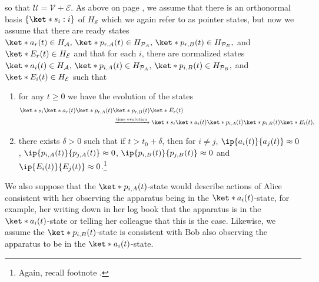 \documentclass[12pt]{report}
\begin{document}
    so that $\mathcal{U}=\mathcal{V}+\mathcal{E}$. As above on page \pageref{pointer}, we  assume that there is an orthonormal basis $\{\ket*{s_i}:i\}$ of $H_\mathcal{S}$ which we again refer to as pointer states, but now we assume that there are ready states $\ket*{a_r(t)}\in H_\mathcal{A},\,\ket*{p_{r, A}(t)}\in H_{\mathcal{P}_A},\,\ket*{p_{r, B}(t)}\in H_{\mathcal{P}_B},$ and  %
%
    $\ket*{E_r(t)}\in H_\mathcal{E}$ and %
    that for each $i$, there are normalized states $\ket*{a_i(t)}\in H_\mathcal{A},\,\ket*{p_{i, A}(t)}\in H_{\mathcal{P}_A},\,\ket*{p_{i, B}(t)}\in H_{\mathcal{P}_B},$ and $\ket*{E_i(t)}\in H_\mathcal{E}$ such 
    that 
%
    \begin{enumerate}[noitemsep, nosep, topsep=0pt]
    \item for any $t\geq 0$ we have the evolution of the states 
    \begin{align*}\ket*{s_i}\ket*{a_r(t)}\ket*{p_{r, A}(t)}&\ket*{p_{r, B}(t)}\ket*{E_r(t)}\\ &\xrightarrow{\text{time evolution}}\ket*{s_i}\ket*{a_i(t)}\ket*{p_{i, A}(t)}\ket*{p_{i, B}(t)}\ket*{E_i(t)},\end{align*}
    \item there exists $\delta>0$ such that if $t>t_0+\delta$, then for $i\neq j$, $\ip{a_i(t)}{a_j(t)}\approx 0$, $\ip{p_{i, A}(t)}{p_{j, A}(t)}\approx 0$, $\ip{p_{i, B}(t)}{p_{j, B}(t)}\approx 0$ and $\ip{E_i(t)}{E_j(t)}\approx 0$.\footnote{Again, recall footnote .}
    \end{enumerate}
    We also suppose that the $\ket*{p_{i,A}(t)}$-state would describe actions of Alice consistent with her observing the apparatus being in the $\ket*{a_i(t)}$-state, for example, her writing down in her log book that the apparatus is in the $\ket*{a_i(t)}$-state or telling her colleague that this is the case. Likewise, we assume the $\ket*{p_{i,B}(t)}$-state is consistent with Bob also observing the apparatus to be in the $\ket*{a_i(t)}$-state.
\end{document}
